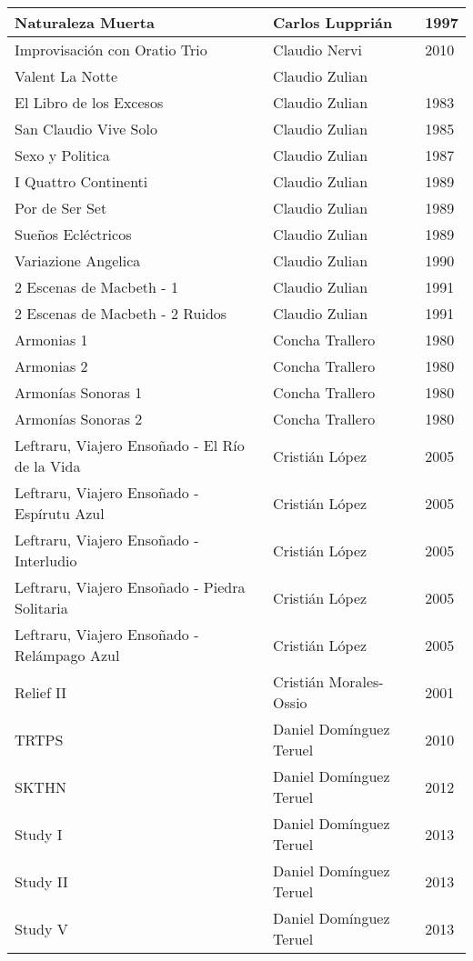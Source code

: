 \begin{center}
\begin{longtable}{| p{} | p{} | p{} |}
Naturaleza Muerta & Carlos Lupprián & 1997 \\ \hline 
Improvisación con Oratio Trio & Claudio Nervi & 2010 \\ \hline 
Valent La Notte & Claudio Zulian &  \\ \hline 
El Libro de los Excesos & Claudio Zulian & 1983 \\ \hline 
San Claudio Vive Solo & Claudio Zulian & 1985 \\ \hline 
Sexo y Politica & Claudio Zulian & 1987 \\ \hline 
I Quattro Continenti & Claudio Zulian & 1989 \\ \hline 
Por de Ser Set & Claudio Zulian & 1989 \\ \hline 
Sueños Ecléctricos & Claudio Zulian & 1989 \\ \hline 
Variazione Angelica & Claudio Zulian & 1990 \\ \hline 
2 Escenas de Macbeth - 1 & Claudio Zulian & 1991 \\ \hline 
2 Escenas de Macbeth - 2 Ruidos & Claudio Zulian & 1991 \\ \hline 
Armonias 1 & Concha Trallero & 1980 \\ \hline 
Armonias 2 & Concha Trallero & 1980 \\ \hline 
Armonías Sonoras 1 & Concha Trallero & 1980 \\ \hline 
Armonías Sonoras 2 & Concha Trallero & 1980 \\ \hline 
Leftraru, Viajero Ensoñado - El Río de la Vida & Cristián López & 2005 \\ \hline 
Leftraru, Viajero Ensoñado - Espírutu Azul & Cristián López & 2005 \\ \hline 
Leftraru, Viajero Ensoñado - Interludio & Cristián López & 2005 \\ \hline 
Leftraru, Viajero Ensoñado - Piedra Solitaria & Cristián López & 2005 \\ \hline 
Leftraru, Viajero Ensoñado - Relámpago Azul & Cristián López & 2005 \\ \hline 
Relief II & Cristián Morales-Ossio & 2001 \\ \hline 
TRTPS & Daniel Domínguez Teruel & 2010 \\ \hline 
SKTHN & Daniel Domínguez Teruel & 2012 \\ \hline 
Study I & Daniel Domínguez Teruel & 2013 \\ \hline 
Study II & Daniel Domínguez Teruel & 2013 \\ \hline 
Study V & Daniel Domínguez Teruel & 2013 \\ \hline 

\end{longtable}
\end{center}
